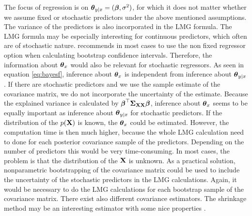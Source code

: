 \documentclass[11pt,a4paper,twoside]{book}
\begin{document}
  The focus of regression is on ${\boldsymbol{\theta}}{}_{y \mid x} = ({\boldsymbol{\beta}}, \sigma^2)$, for which it does not matter whether we assume fixed or stochastic predictors under the above mentioned assumptions. The variance of the predictors is also incorporated in the LMG formula. The LMG formula may be especially interesting for continuous predictors, which often are of stochastic nature. \cite{Gromping2006} recommends in most cases to use the non fixed regressor option when calculating bootstrap confidence intervals. Therefore, the information about ${\boldsymbol{\theta}}{}_{x}$ would  also be relevant for stochastic regressors.  As seen in equation \eqref{eq:bayesf}, inference about ${\boldsymbol{\theta}}{}_{x}$  is independent from inference about ${\boldsymbol{\theta}}{}_{y \mid x}$. If there are stochastic predictors and we use the sample estimate of the covariance matrix, we do not incorporate the uncertainty of the estimate.  Because the explained variance is calculated by ${\boldsymbol{\beta}}^\top {\boldsymbol{\Sigma}}{}_{{\mathbf{X}} {\mathbf{X}}}  {\boldsymbol{\beta}}$, inference about  ${\boldsymbol{\theta}}{}_{x}$  seems to be equally important as inference about ${\boldsymbol{\theta}}{}_{y \mid x}$ for stochastic predictors. If the distribution of the $p({\mathbf{X}})$ is known, the ${\boldsymbol{\theta}}{}_{x}$ could be estimated. However, the computation time is then much higher, because the whole LMG calculation need to done for each posterior covariance sample of the predictors. Depending on the number of predictors this would be very time-consuming. In most cases, the problem is that the distribution of the ${\mathbf{X}}$ is unknown. As a practical solution,  nonparametric bootstrapping of the covariance matrix could be used to include the uncertainty of the stochastic predictors in the LMG calculations. Again, it would be necessary to do the LMG calculations for each bootstrap sample of the covariance matrix. There exist also different covariance estimators. The shrinkage method may be an interesting estimator with some nice properties \citep{Schafer2005}. 
  
  
  
 

 

\end{document}
